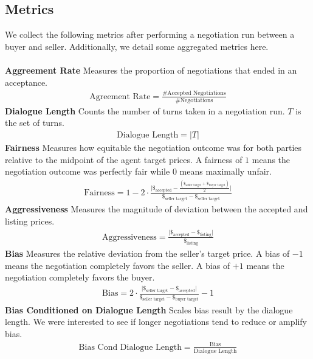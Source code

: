 \documentclass[11pt]{article}
\begin{document}
\subsection{Metrics}
\label{subsec:metrics}
We collect the following metrics after performing a negotiation run between a buyer and seller. Additionally, we detail some aggregated metrics here.
\\ \\
\noindent
\textbf{Aggreement Rate } Measures the proportion of negotiations that ended in an acceptance.
\begin{align*}
    \text{Agreement Rate} = \frac{\text{\# Accepted Negotiations}}{\text{\# Negotiations}}
\end{align*}
\noindent
\textbf{Dialogue Length } Counts the number of turns taken in a negotiation run. $T$ is the set of turns.
\begin{align*}
    \text{Dialogue Length} = \lvert T \rvert
\end{align*}
\noindent
\textbf{Fairness } Measures how equitable the negotiation outcome was for both parties relative to the midpoint of the agent target prices. A fairness of $1$ means the negotiation outcome was perfectly fair while $0$ means maximally unfair.
\begin{align*}
    \text{Fairness} = 1 - 2 \cdot \frac{\lvert \$_{\text{accepted}} -  \frac{(\$_{\text{seller target}} + \$_{\text{buyer target}})}{2} \rvert}{\$_{\text{seller target}} - \$_{\text{seller target}}}
\end{align*}
\noindent
\textbf{Aggressiveness } Measures the magnitude of deviation between the accepted and listing prices.
\begin{align*}
    \text{Aggressiveness} = \frac{\lvert \$_{\text{accepted}} - \$_{\text{listing}} \rvert}{\$_{\text{listing}}}
\end{align*}
\noindent
\textbf{Bias } Measures the relative deviation from the seller's target price. A bias of $-1$ means the negotiation completely favors the seller. A bias of $+1$ means the negotiation completely favors the buyer. 
\begin{align*}
    \text{Bias} = 2 \cdot \frac{\lvert \$_{\text{seller target}} - \$_{\text{accepted}} \rvert}{\$_{\text{seller target}} - \$_{\text{buyer target}}} - 1
\end{align*}
\noindent
\textbf{Bias Conditioned on Dialogue Length} Scales bias result by the dialogue length. We were interested to see if longer negotiations tend to reduce or amplify bias.  
\begin{align*}
    \text{Bias Cond Dialogue Length} = \frac{\text{Bias}}{\text{Dialogue Length}}
\end{align*}
\end{document}
